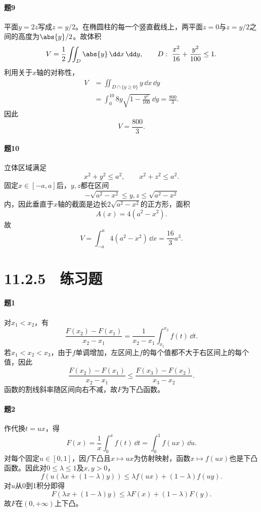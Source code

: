 \paragraph{题9}
\begin{xsolution}
平面$y=2z$写成$z=y/2$。在椭圆柱的每一个竖直截线上，两平面$z=0$与$z=y/2$之间的高度为$\abs{y}/2$。故体积
\[
 V=\frac12\iint_D\abs{y}\,\dd x\,\dd y,
 \qquad
 D:\ \frac{x^2}{16}+\frac{y^2}{100}\le1.
\]
利用关于$x$轴的对称性，
\begin{align*}
V&=\iint_{D\cap\{y\ge0\}}y\,\dd x\,\dd y\\
&=\int_0^{10}8y\sqrt{1-\frac{y^2}{100}}\,\dd y
=\frac{800}{3}.
\end{align*}
因此
\[
 \boxed{V=\frac{800}{3}}.
\]
\end{xsolution}

\paragraph{题10}
\begin{xsolution}
立体区域满足
\[
 x^2+y^2\le a^2,\qquad x^2+z^2\le a^2.
\]
固定$x\in[-a,a]$后，$y,z$都在区间
\[
 -\sqrt{a^2-x^2}\le y,z\le\sqrt{a^2-x^2}
\]
内，因此垂直于$x$轴的截面是边长$2\sqrt{a^2-x^2}$的正方形，面积
\[
 A(x)=4(a^2-x^2).
\]
故
\[
 V=\int_{-a}^a4(a^2-x^2)\,\dd x
 =\boxed{\frac{16}{3}a^3}.
\]
\end{xsolution}

\section*{11.2.5　练习题}

\paragraph{题1}
\begin{xsolution}
对$x_1<x_2$，有
\[
 \frac{F(x_2)-F(x_1)}{x_2-x_1}
 =\frac1{x_2-x_1}\int_{x_1}^{x_2}f(t)\,\dd t.
\]
若$x_1<x_2<x_3$，由于$f$单调增加，左区间上$f$的每个值都不大于右区间上的每个值，因此
\[
 \frac{F(x_2)-F(x_1)}{x_2-x_1}
 \le
 \frac{F(x_3)-F(x_2)}{x_3-x_2}.
\]
函数的割线斜率随区间向右不减，故$F$为下凸函数。
\end{xsolution}

\paragraph{题2}
\begin{xsolution}
作代换$t=ux$，得
\[
 F(x)=\frac1x\int_0^xf(t)\,\dd t=\int_0^1f(ux)\,\dd u.
\]
对每个固定$u\in[0,1]$，因$f$下凸且$x\mapsto ux$为仿射映射，函数$x\mapsto f(ux)$也是下凸函数。因此对$0\le\lambda\le1$及$x,y>0$，
\[
 f(u(\lambda x+(1-\lambda)y))
 \le\lambda f(ux)+(1-\lambda)f(uy).
\]
对$u$从0到1积分即得
\[
 F(\lambda x+(1-\lambda)y)
 \le\lambda F(x)+(1-\lambda)F(y).
\]
故$F$在$(0,+\infty)$上下凸。
\end{xsolution}


